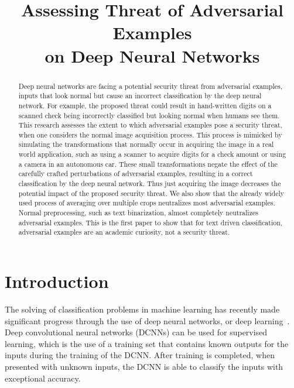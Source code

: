 \documentclass[conference]{IEEEtran}
\title{Assessing Threat of Adversarial Examples \\ on Deep Neural Networks}
\author{\IEEEauthorblockN{Abigail Graese, Andras Rozsa, and Terrance E. Boult }
\IEEEauthorblockA{University of Colorado at Colorado Springs\\
Vision and Security Technology (VAST) Lab\\
Email: http://vast.uccs.edu/contact-us
}}
\begin{document}
\maketitle

\thispagestyle{empty}

\begin{abstract}

Deep neural networks are facing a potential security threat from adversarial examples, inputs that look normal but cause an incorrect classification by the deep neural network.  For example, the proposed threat could result in hand-written digits on a scanned check being incorrectly classified but looking normal when humans see them.  This research assesses the extent to which adversarial examples pose a security threat, when one considers the normal image acquisition process.  This process is mimicked by simulating the transformations that normally occur in acquiring the image in a real world application, such as using a scanner to acquire digits for a check amount or using a camera  in an autonomous car.  These small transformations negate the effect of the carefully crafted perturbations of adversarial examples, resulting in a correct classification by the deep neural network. Thus just acquiring the image decreases the potential impact of the proposed security threat.  We also show that the already widely used process of averaging over multiple crops neutralizes most adversarial examples. Normal preprocessing, such as text binarization, almost completely neutralizes adversarial examples.  This is the first paper to show that for text driven classification, adversarial examples are an academic curiosity, not a security threat.

\end{abstract}

\hfill


\section{Introduction}

The solving of classification problems in machine learning has recently made significant progress through the use of deep neural networks, or deep learning~\cite{c7, c8, c11}.  Deep convolutional neural networks (DCNNs) can be used for supervised learning, which is the use of a training set that contains known outputs for the inputs during the training of the DCNN.  After training is completed, when presented with unknown inputs, the DCNN is able to classify the inputs with exceptional accuracy.
\end{document}

